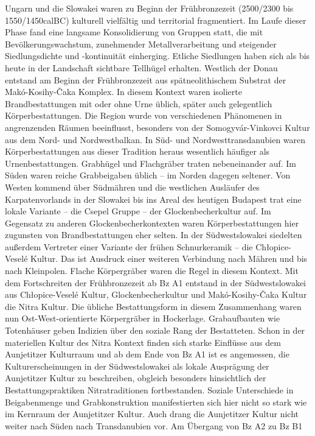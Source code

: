 \documentclass[openany,twoside,twocolumn]{book}
\begin{document}
Ungarn und die Slowakei waren zu Beginn der Frühbronzezeit (2500/2300
bis 1550/1450calBC) kulturell vielfältig und territorial fragmentiert.
Im Laufe dieser Phase fand eine langsame Konsolidierung von Gruppen
statt, die mit Bevölkerungswachstum, zunehmender Metallverarbeitung und
steigender Siedlungsdichte und -kontinuität einherging. Etliche
Siedlungen haben sich als bis heute in der Landschaft sichtbare
Tellhügel erhalten. Westlich der Donau entstand am Beginn der
Frühbronzezeit aus spätneolithischem Substrat der Makó-Kosihy-Čaka
Komplex. In diesem Kontext waren isolierte Brandbestattungen mit oder
ohne Urne üblich, später auch gelegentlich Körperbestattungen. Die
Region wurde von verschiedenen Phänomenen in angrenzenden Räumen
beeinflusst, besonders von der Somogyvár-Vinkovci Kultur aus dem Nord-
und Nordwestbalkan. In Süd- und Nordwesttransdanubien waren
Körperbestattungen aus dieser Tradition heraus wesentlich häufiger als
Urnenbestattungen. Grabhügel und Flachgräber traten nebeneinander auf.
Im Süden waren reiche Grabbeigaben üblich -- im Norden dagegen seltener.
Von Westen kommend über Südmähren und die westlichen Ausläufer des
Karpatenvorlands in der Slowakei bis ins Areal des heutigen Budapest
trat eine lokale Variante -- die Csepel Gruppe -- der
Glockenbecherkultur auf. Im Gegensatz zu anderen Glockenbecherkontexten
waren Körperbestattungen hier zugunsten von Brandbestattungen eher
selten. In der Südwestslowakei siedelten außerdem Vertreter einer
Variante der frühen Schnurkeramik -- die Chłopice-Veselé Kultur. Das ist
Ausdruck einer weiteren Verbindung nach Mähren und bis nach Kleinpolen.
Flache Körpergräber waren die Regel in diesem Kontext. Mit dem
Fortschreiten der Frühbronzezeit ab Bz A1 entstand in der
Südwestslowakei aus Chłopice-Veselé Kultur, Glockenbecherkultur und
Makó-Kosihy-Čaka Kultur die Nitra Kultur. Die übliche Bestattungsform in
diesem Zusammenhang waren nun Ost-West-orientierte Körpergräber in
Hockerlage. Grabaufbauten wie Totenhäuser geben Indizien über den
soziale Rang der Bestatteten. Schon in der materiellen Kultur des Nitra
Kontext finden sich starke Einflüsse aus dem Aunjetitzer Kulturraum und
ab dem Ende von Bz A1 ist es angemessen, die Kulturerscheinungen in der
Südwestslowakei als lokale Ausprägung der Aunjetitzer Kultur zu
beschreiben, obgleich besonders hinsichtlich der Bestattungspraktiken
Nitratraditionen fortbestanden. Soziale Unterschiede in Beigabenmenge
und Grabkonstruktion manifestierten sich hier nicht so stark wie im
Kernraum der Aunjetitzer Kultur. Auch drang die Aunjetitzer Kultur nicht
weiter nach Süden nach Transdanubien vor. Am Übergang von Bz A2 zu Bz B1
\end{document}
